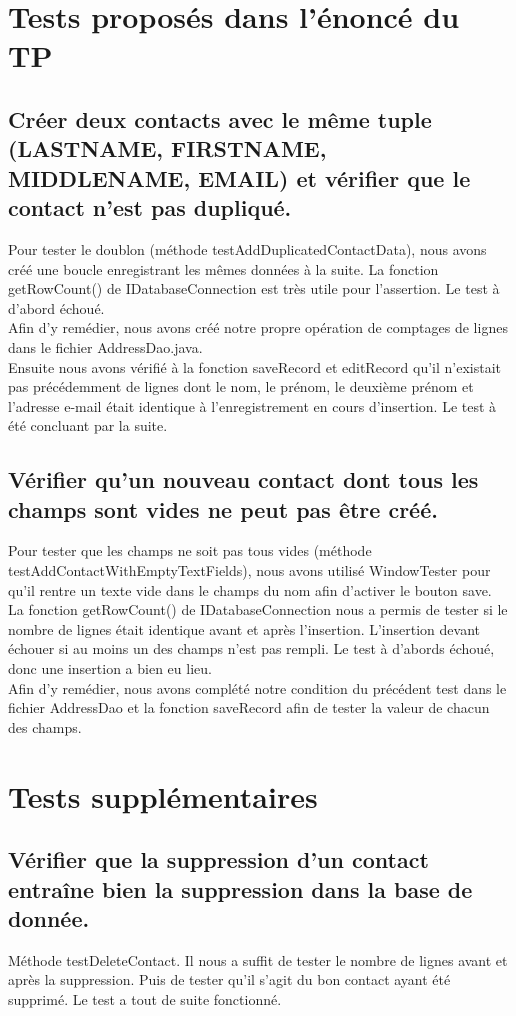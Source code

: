 \documentclass[a4paper,oneside,frenchb,12pt]{report}
\begin{document}
\section{Tests proposés dans l'énoncé du TP}

\subsection{Créer deux contacts avec le même tuple (LASTNAME, FIRSTNAME, MIDDLENAME, EMAIL) et 
vérifier que le contact n’est pas dupliqué.} 
Pour tester le doublon (méthode testAddDuplicatedContactData), nous avons créé une boucle enregistrant les mêmes données à la suite. 
La fonction getRowCount() de IDatabaseConnection est très utile pour l'assertion.
Le test à d'abord échoué.\\
Afin d'y remédier, nous avons créé notre propre opération de comptages de lignes dans le fichier AddressDao.java.\\
Ensuite nous avons vérifié à la fonction saveRecord et editRecord qu'il n'existait pas précédemment de lignes
dont le nom, le prénom, le deuxième prénom et l'adresse e-mail était identique à l'enregistrement en cours d'insertion. 
Le test à été concluant par la suite.

\subsection{Vérifier qu’un nouveau contact dont tous les champs sont vides ne peut pas être créé.} 
Pour tester que les champs ne soit pas tous vides (méthode testAddContactWithEmptyTextFields), 
nous avons utilisé WindowTester pour qu'il rentre un texte vide dans le champs du nom afin d'activer le bouton save.
La fonction getRowCount() de IDatabaseConnection nous a permis de tester si le nombre de lignes était identique avant et après l'insertion.
L'insertion devant échouer si au moins un des champs n'est pas rempli.
Le test à d'abords échoué, donc une insertion a bien eu lieu.\\
Afin d'y remédier, nous avons complété notre condition du précédent test dans le fichier AddressDao et la fonction saveRecord
afin de tester la valeur de chacun des champs.

\section{Tests supplémentaires}
 
\subsection{Vérifier que la suppression d'un contact entraîne bien la suppression dans la base de donnée.} 
Méthode testDeleteContact. Il nous a suffit de tester le nombre de lignes avant et après la suppression. 
Puis de tester qu'il s'agit du bon contact ayant été supprimé. Le test a tout de suite fonctionné.
 
\end{document}
